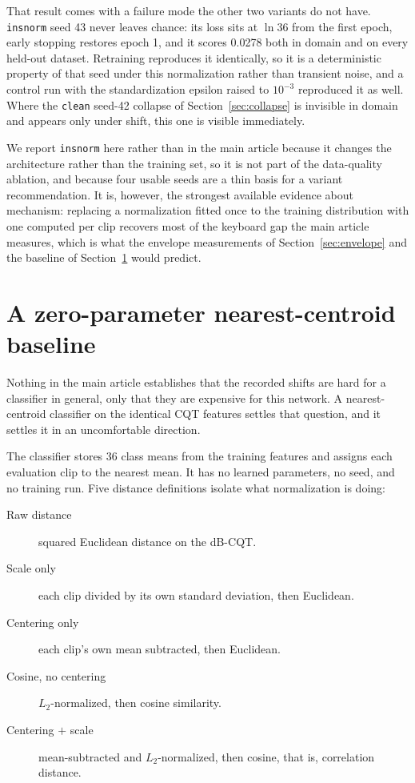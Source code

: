 \documentclass[pdflatex,sn-mathphys-num]{sn-jnl}
\begin{document}
That result comes with a failure mode the other two variants do not have. \texttt{insnorm} seed 43 never leaves chance: its loss sits at $\ln 36$ from the first epoch, early stopping restores epoch 1, and it scores 0.0278 both in domain and on every held-out dataset. Retraining reproduces it identically, so it is a deterministic property of that seed under this normalization rather than transient noise, and a control run with the standardization epsilon raised to $10^{-3}$ reproduced it as well. Where the \texttt{clean} seed-42 collapse of Section~\ref{sec:collapse} is invisible in domain and appears only under shift, this one is visible immediately.

We report \texttt{insnorm} here rather than in the main article because it changes the architecture rather than the training set, so it is not part of the data-quality ablation, and because four usable seeds are a thin basis for a variant recommendation. It is, however, the strongest available evidence about mechanism: replacing a normalization fitted once to the training distribution with one computed per clip recovers most of the keyboard gap the main article measures, which is what the envelope measurements of Section~\ref{sec:envelope} and the baseline of Section~\ref{sec:baseline} would predict.

\section{A zero-parameter nearest-centroid baseline}\label{sec:baseline}

Nothing in the main article establishes that the recorded shifts are hard for a classifier in general, only that they are expensive for this network. A nearest-centroid classifier on the identical CQT features settles that question, and it settles it in an uncomfortable direction.

The classifier stores 36 class means from the training features and assigns each evaluation clip to the nearest mean. It has no learned parameters, no seed, and no training run. Five distance definitions isolate what normalization is doing:

\begin{description}
\item[Raw distance] squared Euclidean distance on the dB-CQT.
\item[Scale only] each clip divided by its own standard deviation, then Euclidean.
\item[Centering only] each clip's own mean subtracted, then Euclidean.
\item[Cosine, no centering] $L_2$-normalized, then cosine similarity.
\item[Centering $+$ scale] mean-subtracted and $L_2$-normalized, then cosine, that is, correlation distance.
\end{description}
\end{document}
